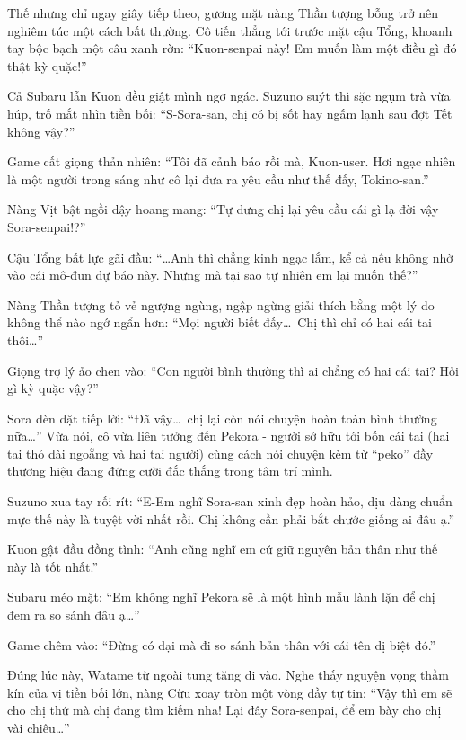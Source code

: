 \documentclass[../main.tex]{subfiles}
\begin{document}
Thế nhưng chỉ ngay giây tiếp theo, gương mặt nàng Thần tượng bỗng trở nên nghiêm túc một cách bất thường. Cô tiến thẳng tới trước mặt cậu Tổng, khoanh tay bộc bạch một câu xanh rờn: ``Kuon-senpai này! Em muốn làm một điều gì đó thật kỳ quặc!''


Cả Subaru lẫn Kuon đều giật mình ngơ ngác. Suzuno suýt thì sặc ngụm trà vừa húp, trố mắt nhìn tiền bối: ``S-Sora-san, chị có bị sốt hay ngấm lạnh sau đợt Tết không vậy?''

Game cất giọng thản nhiên: ``Tôi đã cảnh báo rồi mà, Kuon-user. Hơi ngạc nhiên là một người trong sáng như cô lại đưa ra yêu cầu như thế đấy, Tokino-san.''

Nàng Vịt bật ngồi dậy hoang mang: ``Tự dưng chị lại yêu cầu cái gì lạ đời vậy Sora-senpai!?''

Cậu Tổng bất lực gãi đầu: ``\dots Anh thì chẳng kinh ngạc lắm, kể cả nếu không nhờ vào cái mô-đun dự báo này. Nhưng mà tại sao tự nhiên em lại muốn thế?''

Nàng Thần tượng tỏ vẻ ngượng ngùng, ngập ngừng giải thích bằng một lý do không thể nào ngớ ngẩn hơn: ``Mọi người biết đấy\dots\ Chị thì chỉ có hai cái tai thôi\dots''

Giọng trợ lý ảo chen vào: ``Con người bình thường thì ai chẳng có hai cái tai? Hỏi gì kỳ quặc vậy?''

Sora dèn dặt tiếp lời: ``Đã vậy\dots\ chị lại còn nói chuyện hoàn toàn bình thường nữa\dots'' Vừa nói, cô vừa liên tưởng đến Pekora - người sở hữu tới bốn cái tai (hai tai thỏ dài ngoẵng và hai tai người) cùng cách nói chuyện kèm từ ``peko'' đầy thương hiệu đang đứng cười đắc thắng trong tâm trí mình.


Suzuno xua tay rối rít: ``E-Em nghĩ Sora-san xinh đẹp hoàn hảo, dịu dàng chuẩn mực thế này là tuyệt vời nhất rồi. Chị không cần phải bắt chước giống ai đâu ạ.''

Kuon gật đầu đồng tình: ``Anh cũng nghĩ em cứ giữ nguyên bản thân như thế này là tốt nhất.''

Subaru méo mặt: ``Em không nghĩ Pekora sẽ là một hình mẫu lành lặn để chị đem ra so sánh đâu ạ\dots''

Game chêm vào: ``Đừng có dại mà đi so sánh bản thân với cái tên dị biệt đó.''

Đúng lúc này, Watame từ ngoài tung tăng đi vào. Nghe thấy nguyện vọng thầm kín của vị tiền bối lớn, nàng Cừu xoay tròn một vòng đầy tự tin: ``Vậy thì em sẽ cho chị thứ mà chị đang tìm kiếm nha! Lại đây Sora-senpai, để em bày cho chị vài chiêu\dots''
\end{document}
